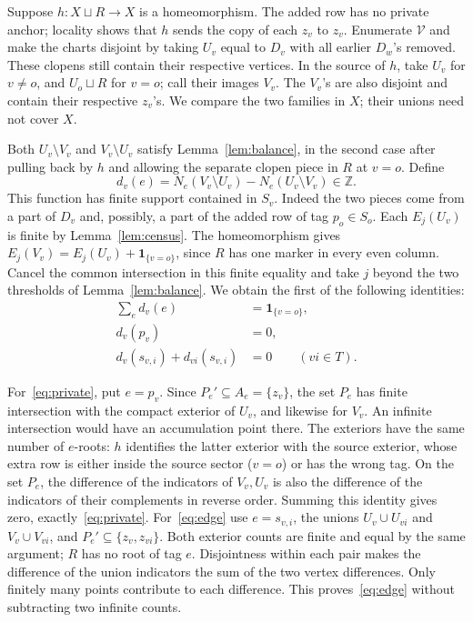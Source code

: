 \documentclass[11pt,letterpaper]{article}
\theoremstyle{definition}\newtheorem{definition}[theorem]{Definition}
\begin{document}
Suppose \(h:X\sqcup R\longrightarrow X\) is a homeomorphism. The added
row has no private anchor; locality shows that \(h\) sends the copy of
each \(z_v\) to \(z_v\). Enumerate \(\mathcal V\) and make the charts
disjoint by taking \(U_v\) equal to \(D_v\) with all earlier \(D_w\)'s
removed. These clopens still contain their respective vertices. In the
source of \(h\), take \(U_v\) for \(v\ne o\), and \(U_o\sqcup R\) for
\(v=o\); call their images \(V_v\). The \(V_v\)'s are also disjoint and
contain their respective \(z_v\)'s. We compare the two families in \(X\);
their unions need not cover \(X\).

Both \(U_v\setminus V_v\) and \(V_v\setminus U_v\) satisfy
Lemma~\ref{lem:balance}, in the second case after pulling back by \(h\)
and allowing the separate clopen piece in \(R\) at \(v=o\). Define
\[
 d_v(e)=N_e(V_v\setminus U_v)-N_e(U_v\setminus V_v)\in\mathbb Z .
\]
This function has finite support contained in \(S_v\). Indeed the two
pieces come from a part of \(D_v\) and, possibly, a part of the added row
of tag \(p_o\in S_o\). Each \(E_j(U_v)\) is finite by
Lemma~\ref{lem:census}. The homeomorphism gives
\(E_j(V_v)=E_j(U_v)+\mathbf1_{\{v=o\}}\), since \(R\) has one marker
in every even column. Cancel the common intersection in this finite
equality and take \(j\) beyond the two thresholds of
Lemma~\ref{lem:balance}. We obtain the first of the following identities:
\begin{align}
 \sum_e d_v(e)&=\mathbf1_{\{v=o\}},\label{eq:sum}\\
 d_v(p_v)&=0,\label{eq:private}\\
 d_v(s_{v,i})+d_{vi}(s_{v,i})&=0 \qquad(vi\in T).\label{eq:edge}
\end{align}

For~\eqref{eq:private}, put \(e=p_v\). Since \(P_e'\subseteq A_e=\{z_v\}\),
the set \(P_e\) has finite intersection with the compact exterior of
\(U_v\), and likewise for \(V_v\). An infinite intersection would have an
accumulation point there. The exteriors have the same number of \(e\)-roots:
\(h\) identifies the latter exterior with the source exterior, whose extra
row is either inside the source sector (\(v=o\)) or has the wrong tag.
On the set \(P_e\), the difference of the indicators of \(V_v,U_v\)
is also the difference of the indicators of their complements in reverse
order. Summing this identity gives zero, exactly~\eqref{eq:private}.
For~\eqref{eq:edge} use \(e=s_{v,i}\), the unions
\(U_v\cup U_{vi}\) and \(V_v\cup V_{vi}\), and
\(P_e'\subseteq\{z_v,z_{vi}\}\). Both exterior counts are finite and equal
by the same argument; \(R\) has no root of tag \(e\). Disjointness
within each pair makes the difference of the union indicators the sum
of the two vertex differences. Only finitely many points contribute to
each difference. This proves~\eqref{eq:edge} without subtracting two
infinite counts.
\end{document}
